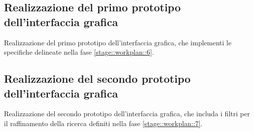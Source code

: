 \documentclass[10pt,a4paper,hidelinks]{scrartcl} %
\begin{document}
	\subsection{Realizzazione del primo prototipo dell'interfaccia grafica}
	\label{stage::workplan::10}
	Realizzazione del primo prototipo dell'interfaccia grafica, che implementi le specifiche delineate nella fase \ref{stage::workplan::6}.

	\subsection{Realizzazione del secondo prototipo dell'interfaccia grafica}
	\label{stage::workplan::11}
	Realizzazione del secondo prototipo dell'interfaccia grafica, che includa i filtri per il raffinamento della ricerca definiti nella fase \ref{stage::workplan::7}.
	
\end{document}
